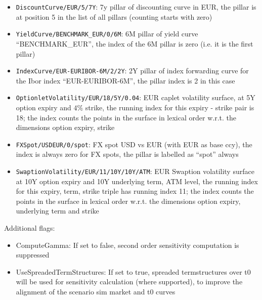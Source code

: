 \documentclass[12pt, a4paper]{article}
\begin{document}
{{\begin{itemize}
\item {\tt DiscountCurve/EUR/5/7Y}: 7y pillar of discounting curve in EUR, the pillar is at position 5 in the list of
  all pillars (counting starts with zero)
\item {\tt YieldCurve/BENCHMARK\_EUR/0/6M}: 6M pillar of yield curve ``BENCHMARK\_EUR'', the index of the 6M pillar is
  zero (i.e. it is the first pillar)
\item {\tt IndexCurve/EUR-EURIBOR-6M/2/2Y}: 2Y pillar of index forwarding curve for the Ibor index ``EUR-EURIBOR-6M'',
  the pillar index is 2 in this case
\item {\tt OptionletVolatility/EUR/18/5Y/0.04}: EUR caplet volatility surface, at 5Y option expiry and $4\%$ strike, the
  running index for this expiry - strike pair is 18; the index counts the points in the surface in lexical order
  w.r.t. the dimensions option expiry, strike
\item {\tt FXSpot/USDEUR/0/spot}: FX spot USD vs EUR (with EUR as base ccy), the index is always zero for FX spots, the
  pillar is labelled as ``spot'' always
\item {\tt SwaptionVolatility/EUR/11/10Y/10Y/ATM}: EUR Swaption volatility surface at 10Y option expiry and 10Y
  underlying term, ATM level, the running index for this expiry, term, strike triple has running index 11; the index
  counts the points in the surface in lexical order w.r.t. the dimensions option expiry, underlying term and strike
\end{itemize}

Additional flags:

\begin{itemize}
\item ComputeGamma: If set to false, second order sensitivity computation is suppressed
\item UseSpreadedTermStructures: If set to true, spreaded termstructures over t0 will be used for sensitivity
  calculation (where supported), to improve the alignment of the scenario sim market and t0 curves
\end{itemize}

}}
\end{document}
